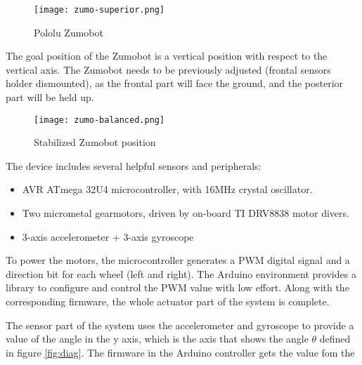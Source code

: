 \begin{figure}[h]
  \centering
  \texttt{[image: zumo-superior.png]}
  \caption{Pololu Zumobot}\label{fig:zumo}
\end{figure}

The goal position of the Zumobot is a vertical position with respect to the vertical axis. The Zumobot needs to be previously adjusted (frontal sensors holder dismounted), as the frontal part will face the ground, and the posterior part will be held up.

\begin{figure}[h]
  \centering
  \texttt{[image: zumo-balanced.png]}
  \caption{Stabilized Zumobot position}\label{fig:zumoStable}
\end{figure}

The device includes several helpful sensors and peripherals:

\begin{itemize}
  \item AVR ATmega 32U4 microcontroller, with 16MHz crystal oscillator.
  \item Two micrometal gearmotors, driven by on-board TI DRV8838 motor divers.
  \item 3-axis accelerometer + 3-axis gyroscope
\end{itemize}

To power the motors, the microcontroller generates a PWM digital signal and a direction bit for each wheel (left and right). The Arduino environment provides a library to configure and control the PWM value with low effort. Along with the corresponding firmware, the whole actuator part of the system is complete.

The sensor part of the system uses the accelerometer and gyroscope to provide a value of the angle in the y axis, which is the axis that shows the angle $\theta$ defined in figure \ref{fig:diag}. The firmware in the Arduino controller gets the value fom the 
